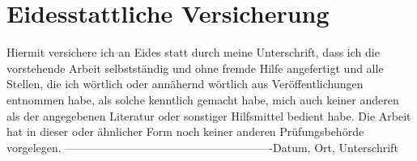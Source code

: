\documentclass[a4paper, 12pt, oneside]{scrbook}
\begin{document}

\frontmatter

\tableofcontents
\listoffigures
\let\defaultclearpage\clearpage
\let\clearpage\relax
\listofalgorithms
\let\clearpage\defaultclearpage
\mainmatter







\backmatter
\printbibliography
\pagestyle{empty}
\pagebreak

\section*{Eidesstattliche Versicherung}
Hiermit versichere ich an Eides statt durch meine Unterschrift, dass ich die vorstehende Arbeit selbstständig und ohne fremde Hilfe angefertigt und alle Stellen, die ich wörtlich oder annähernd wörtlich aus Veröffentlichungen entnommen habe, als solche kenntlich gemacht habe, mich auch keiner anderen als der angegebenen Literatur oder sonstiger Hilfsmittel bedient habe. Die Arbeit hat in dieser oder ähnlicher Form noch keiner anderen Prüfungsbehörde vorgelegen.
\linebreak[4]
\linebreak[4]
\linebreak[4]
\linebreak[4]
-------------------------------------------------------\linebreak[4]
Datum, Ort, Unterschrift
\end{document}
